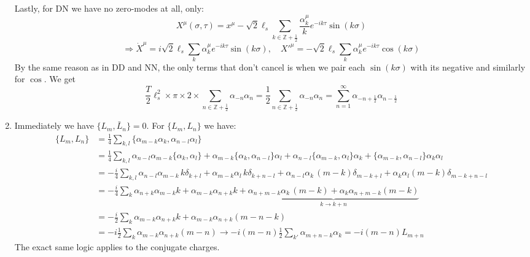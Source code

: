 \documentclass[11pt, class=article, crop=false]{standalone}
\begin{document}
\begin{enumerate}
		Lastly, for DN we have no zero-modes at all, only:
		\begin{equation}
			X^\mu(\sigma, \tau) = x^\mu - \sqrt{2}\ell_s \sum_{k \in \mathbb Z+\frac12} \frac{\alpha^\mu_k}{k} e^{-ik\tau} \sin(k\sigma)
		\end{equation} 
		\[
			\Rightarrow \dot X^\mu = i \sqrt2 \ell_s \sum_k \alpha_k^\mu e^{-ik\tau}\sin(k \sigma), \quad {X'}^\mu = -\sqrt2 \ell_s \sum_k \alpha_k^\mu e^{-ik\tau} \cos(k \sigma)
		\]
		By the same reason as in DD and NN, the only terms that don't cancel is when we pair each $\sin(k \sigma)$ with its negative and similarly for $\cos$. We get
		\begin{equation}
			\frac T2 \ell_s^2 \times \pi \times 2 \times \sum_{n \in \mathbb Z + \frac12} \alpha_{-n} \alpha_n = \frac12 \sum_{n \in \mathbb Z + \frac12} \alpha_{-n} \alpha_n = \sum_{n=1}^\infty \alpha_{-n+\frac12} \alpha_{n-\frac12}
		\end{equation}
		 
		 \item Immediately we have $\{L_m, \bar L_n \} = 0$. For $\{L_m, L_n \}$ we have:
		 \[
		 	\begin{aligned}
		 		\{L_m, L_n \} &= \frac14 \sum_{k, l} \{\alpha_{m-k} \alpha_k , \alpha_{n-l} \alpha_l \} %
				 \\
				& = \frac14 \sum_{k, l}  \alpha_{n-l} \alpha_{m-k} \{\alpha_k ,  \alpha_l \} + \alpha_{m-k} \{\alpha_k , \alpha_{n-l} \}  \alpha_l + \alpha_{n-l}  \{\alpha_{m-k} , \alpha_l \} \alpha_k + \{\alpha_{m-k} , \alpha_{n-l}\}   \alpha_k \alpha_l\\
				& = -\frac i4 \sum_{k, l} \alpha_{n-l} \alpha_{m-k} \, k \delta_{k+l}  + \alpha_{m-k} \alpha_l \, k \delta_{k+n-l} + \alpha_{n-l} \alpha_k \, (m-k) \delta_{m-k+l}  + \alpha_k \alpha_l (m-k) \delta_{m-k+n-l}\\
				& = -\frac i4 \sum_k  \alpha_{n+k} \alpha_{m-k} k  + \alpha_{m-k} \alpha_{n+k} k + \underbrace{ \alpha_{n+m-k} \alpha_k \, (m-k)  + \alpha_k \alpha_{n+m-k} (m-k)}_{k\to k + n } \\
				&  = -\frac{i}{2} \sum_{k} \alpha_{m-k} \alpha_{n+k} k + \alpha_{m-k} \alpha_{n+k} (m-n-k)\\
				& = - i \frac12 \sum_{k} \alpha_{m-k} \alpha_{n+k} (m-n) \to - i (m-n) \frac12 \sum_{k'} \alpha_{m+n-k} \alpha_{k} = - i (m-n) L_{m+n}
		 	\end{aligned}
		 \]
		 The exact same logic applies to the conjugate charges. 
		 
	\end{enumerate}
	
\end{document}
